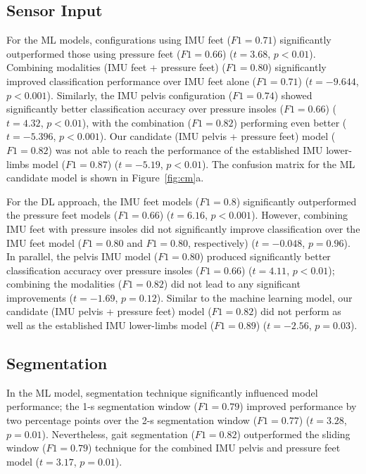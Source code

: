 \documentclass[sensors,article,accept,pdftex,moreauthors]{Definitions/mdpi}
\begin{document}
{\subsection{Sensor Input}}

For the ML models, configurations using IMU feet {($F1=0.71$)} significantly outperformed those using pressure feet {($F1=0.66$) ($t=3.68$, $p<0.01$)}. Combining modalities (IMU feet + pressure feet) {($F1=0.80$)} significantly improved classification performance over IMU feet alone {($F1=0.71$) ($t=-9.644$, $p<0.001$)}. {Similarly, the IMU pelvis configuration ($F1=0.74$) showed significantly better classification accuracy over pressure insoles ($F1=0.66$) ($t=4.32$, $p<0.01$), with the combination ($F1=0.82$) performing even better ($t=-5.396$, $p< 0.001$).} Our {candidate (IMU pelvis + pressure feet)} model ($F1=0.82$) was not able to reach the performance of the established IMU lower-limbs model ($F1=0.87$) ($t=-5.19$, $p<0.01$). The confusion matrix for the ML candidate model is shown in Figure~\ref{fig:cm}a. 

For the DL approach, the IMU feet models ($F1=0.8$) significantly outperformed the pressure feet models {($F1=0.66$) ($t=6.16$, $p<0.001$)}. However, combining IMU feet with pressure insoles did not significantly improve classification over the IMU feet model {($F1=0.80$} and $F1=0.80$, respectively) {($t=-0.048$, $p=0.96$)}. 
{In parallel, the pelvis IMU model ($F1=0.80$) produced significantly better classification accuracy over pressure insoles ($F1=0.66$) ($t=4.11$, $p< 0.01$); combining the modalities ($F1=0.82$) did not lead to any significant improvements ($t=-1.69$, $p=0.12$).}         
 Similar to the machine learning model, our {candidate (IMU pelvis + pressure feet)} model ($F1=0.82$) did not perform as well as the established IMU lower-limbs model ($F1=0.89$) ($t=-2.56$, $p=0.03$). 
 


   



{\subsection{Segmentation}}




{In the ML model}, segmentation technique significantly influenced model performance; {the 1-s segmentation window ($F1=0.79$) improved performance by two percentage points over the 2-s segmentation window ($F1=0.77$) ($t=3.28$, $p=0.01$)}. Nevertheless, gait segmentation ($F1=0.82$) outperformed the sliding window  ($F1=0.79$) technique for the combined {IMU pelvis and pressure feet} model ($t=3.17$, $p=0.01$). 
\end{document}
